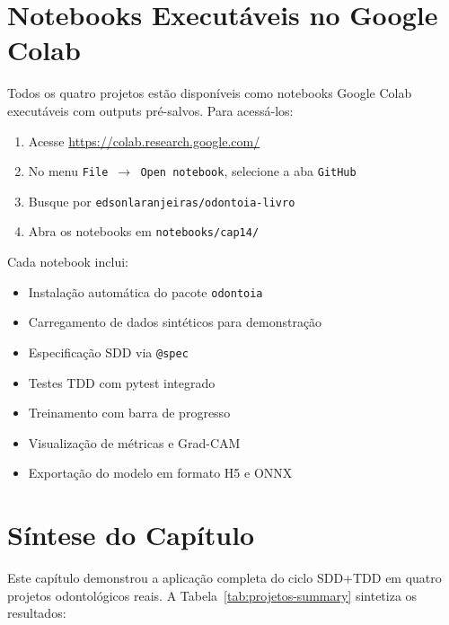 
\section{Notebooks Executáveis no Google Colab}

Todos os quatro projetos estão disponíveis como notebooks Google Colab
executáveis com outputs pré-salvos. Para acessá-los:

\begin{enumerate}
  \item Acesse \url{https://colab.research.google.com/}
  \item No menu \texttt{File $\rightarrow$ Open notebook}, selecione a aba \texttt{GitHub}
  \item Busque por \texttt{edsonlaranjeiras/odontoia-livro}
  \item Abra os notebooks em \texttt{notebooks/cap14/}
\end{enumerate}

Cada notebook inclui:

\begin{itemize}
  \item Instalação automática do pacote \texttt{odontoia}
  \item Carregamento de dados sintéticos para demonstração
  \item Especificação SDD via \texttt{@spec}
  \item Testes TDD com pytest integrado
  \item Treinamento com barra de progresso
  \item Visualização de métricas e Grad-CAM
  \item Exportação do modelo em formato H5 e ONNX
\end{itemize}

\section{Síntese do Capítulo}

Este capítulo demonstrou a aplicação completa do ciclo SDD+TDD em quatro
projetos odontológicos reais. A Tabela~\ref{tab:projetos-summary} sintetiza
os resultados:

